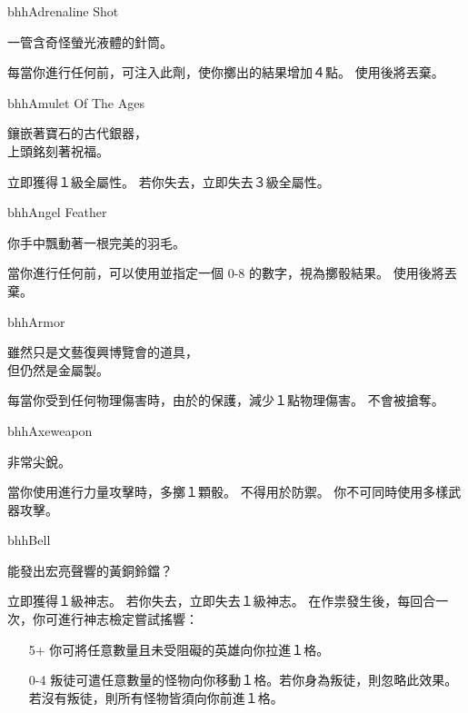 
\begin{ItemCard}{bhh}{Adrenaline Shot}{}
  \begin{CardStory}
    一管含奇怪螢光液體的針筒。
  \end{CardStory}
  每當你進行任何前，可注入此劑，使你擲出的結果增加４點。 \smallbreak
  使用後將\ThisName{}丟棄。\smallbreak
\end{ItemCard}%
\linebreak[0]%
\begin{ItemCard}{bhh}{Amulet Of The Ages}{}
  \begin{CardStory}
    鑲嵌著寶石的古代銀器，\\
    上頭銘刻著祝福。
  \end{CardStory}
  立即獲得１級全屬性。\smallbreak
  若你失去\ThisName{}，立即失去３級全屬性。\smallbreak
\end{ItemCard}%
\linebreak[0]%
\begin{ItemCard}{bhh}{Angel Feather}{}
  \begin{CardStory}
    你手中飄動著一根完美的羽毛。
  \end{CardStory}
  當你進行任何\RollAny{}前，可以使用\ThisName{}並指定一個 0-8 的數字，視為擲骰結果。\smallbreak
  使用後將\ThisName{}丟棄。\smallbreak
\end{ItemCard}%
\linebreak[0]%
\begin{ItemCard}{bhh}{Armor}{}
  \begin{CardStory}
    雖然只是文藝復興博覽會的道具，\\
    但仍然是金屬製。
  \end{CardStory}
  每當你受到任何物理傷害時，由於\ThisName{}的保護，減少１點物理傷害。\smallbreak
  \ThisName{}不會被搶奪。\smallbreak
\end{ItemCard}%
\linebreak[0]%
\begin{ItemCard}{bhh}{Axe}{weapon}
  \begin{CardStory}
    非常尖銳。
  \end{CardStory}
  當你使用\ThisName{}進行力量攻擊時，多擲１顆骰。\smallbreak
  \ThisName{}不得用於防禦。\smallbreak
  你不可同時使用多樣武器攻擊。\smallbreak
\end{ItemCard}%
\linebreak[0]%
\begin{ItemCard}{bhh}{Bell}{}
  \begin{CardStory}
    能發出宏亮聲響的黃銅鈴鐺？
  \end{CardStory}
  立即獲得１級神志。\smallbreak
  若你失去\ThisName{}，立即失去１級神志。\smallbreak
  在作祟發生後，每回合一次，你可進行神志檢定嘗試搖響\ThisName{}：
  \begin{itemize}
    \item[5+] 你可將任意數量且未受阻礙的英雄向你拉進１格。
    \item[0-4] 叛徒可遣任意數量的怪物向你移動１格。若你身為叛徒，則忽略此效果。若沒有叛徒，則所有怪物皆須向你前進１格。
  \end{itemize}
\end{ItemCard}%
